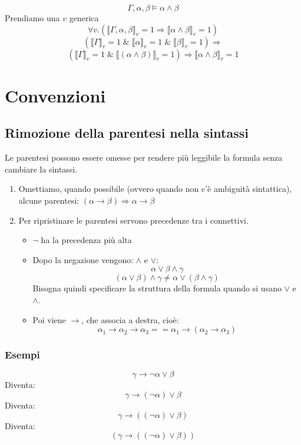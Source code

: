 \documentclass{article}
\theoremstyle{break}
\theoremstyle{break}
\theoremstyle{break}
\theoremstyle{break}
\begin{document}
\begin{exercise}
  \[
    \Gamma, \alpha, \beta \models \alpha \wedge \beta
  \]
  Prendiamo una \( v \) generica
  \[
    \forall v. (\llbracket \Gamma, \alpha, \beta\rrbracket_v=1 \Rightarrow \llbracket \alpha \wedge \beta\rrbracket_v=1)
  \]
  \[
    (\llbracket \Gamma\rrbracket_v=1\; \&\; \llbracket \alpha\rrbracket_v=1\; \&\; \llbracket \beta\rrbracket_v=1) \Rightarrow
  \]
  \[
    (\llbracket \Gamma\rrbracket_v=1\; \&\; \llbracket (\alpha \wedge \beta)\rrbracket_v=1) \Rightarrow \llbracket \alpha \wedge \beta\rrbracket_v=1
  \]
\end{exercise}


\section{Convenzioni}
\subsection{Rimozione della parentesi nella sintassi}
Le parentesi possono essere omesse per rendere più leggibile la formula senza cambiare
la sintassi.
\begin{enumerate}
  \item Omettiamo, quando possibile (ovvero quando non c'è ambiguità sintattica),
    alcune parentesi: \( (\alpha \to \beta) \Rightarrow \alpha \to \beta \) 
  \item Per ripristinare le parentesi servono precedenze tra i connettivi.
    \begin{itemize}
      \item \( \neg \) ha la precedenza più alta
      \item Dopo la negazione vengono: \( \wedge \) e \( \vee \):
        \[
          \alpha \vee \beta \wedge \gamma
        \] 
        \[
          (\alpha \vee \beta) \wedge \gamma \neq \alpha \vee (\beta \wedge \gamma)
        \] 
        Bisogna quindi specificare la struttura della formula quando si usano \( \vee \) e \( \wedge \).
      \item Poi viene \( \to  \), che associa a destra, cioè:
        \[
          \alpha_1 \to \alpha_2 \to \alpha_3 == \alpha_1 \to (\alpha_2 \to \alpha_3)
        \] 
    \end{itemize}
\end{enumerate}

\subsubsection{Esempi}
\[
  \gamma \to  \neg \alpha \vee \beta 
\] 
Diventa:
\[
  \gamma \to (\neg \alpha) \vee \beta
\] 
Diventa:
\[
  \gamma \to ((\neg \alpha) \vee \beta)
\] 
Diventa:
\[
  (\gamma \to ((\neg \alpha) \vee \beta))
\]
\end{document}
